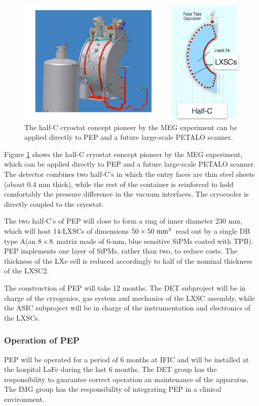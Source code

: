 \begin{figure}[!htb]
	\centering
	\includegraphics[scale=0.45]{img/HalfC.png}
	\caption{\label{fig.halfC} The half-C cryostat concept pioneer by the MEG experiment can be applied directly
	to PEP and a future large-scale PETALO scanner. }
\end{figure}

Figure \ref{fig.halfC} shows the half-C cryostat concept pioneer by the MEG experiment, which can be applied directly to PEP and a future large-scale PETALO scanner. The detector combines two half-C's in which the entry
faces are thin steel sheets (about 0.4 mm thick), while the rest of the container is reinforced to hold comfortably
	the pressure difference in the vacuum interfaces.  The cryocooler is directly coupled to the cryostat.    

The two half-C's of PEP will close to form a ring of inner diameter 230 mm, which will host 14-LXSCs
of dimensions  $50 \times 50 \time 25\mathrm{~mm^3}$~read out by a single DB type A(an $8 \times 8$~matrix made of 6-mm, blue sensitive SiPMs coated with TPB). PEP implements one layer of SiPMs, rather than two, to reduce costs. The thickness of the LXe cell is reduced accordingly to half of the nominal thickness of the LXSC2. 

The construction of PEP will take 12 months. The DET subproject will be in charge of the cryogenics, gas system and mechanics of the LXSC assembly, while the ASIC subproject will be in charge of the instrumentation and electronics of the LXSCs. 



\subsubsection*{Operation of PEP}
PEP will be operated for a period of 6 months at IFIC and will be installed at the hospital LaFe during the last 6 months. The DET group has the responsibility to guarantee correct operation an maintenance of the apparatus. The IMG group has the responsibility of integrating PEP in a clinical environment. 


